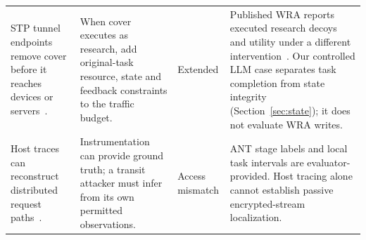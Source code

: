 \begin{table}[t]
\begin{tabularx}{\textwidth}{@{}P{.25\textwidth}P{.29\textwidth}P{.10\textwidth}Y@{}}
STP tunnel endpoints remove cover before it reaches devices or servers~\cite[Sec.~7.1]{apthorpe2019stp}. & When cover executes as research, add original-task resource, state and feedback constraints to the traffic budget. & Extended & Published WRA reports executed research decoys and utility under a different intervention~\cite{jeong2026wra}. Our controlled LLM case separates task completion from state integrity (Section~\ref{sec:state}); it does not evaluate WRA writes. \\\addlinespace[3pt]
Host traces can reconstruct distributed request paths~\cite{reynolds2006wap5,tak2009vpath}. & Instrumentation can provide ground truth; a transit attacker must infer from its own permitted observations. & Access mismatch & ANT stage labels and local task intervals are evaluator-provided. Host tracing alone cannot establish passive encrypted-stream localization. \\\bottomrule
\end{tabularx}
\end{table}
